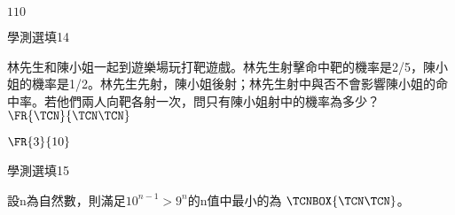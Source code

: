 \begin{QUESTIONS}
\begin{QUESTION}
\begin{QBODY}
        \end{QBODY}
        \begin{QFROMS}
        \end{QFROMS}
        \begin{QTAGS}\end{QTAGS}
        \begin{QANS}
            $110$
        \end{QANS}
        \begin{QSOLLIST}
        \end{QSOLLIST}
        \begin{QEMPTYSPACE}
        \end{QEMPTYSPACE}
    \end{QUESTION}
    \begin{QUESTION}
        \begin{ExamInfo}{84}{學測}{選填}{14}
        \end{ExamInfo}
        \begin{ExamAnsRateInfo}{}{}{}{}
        \end{ExamAnsRateInfo}
        \begin{QBODY}
            林先生和陳小姐一起到遊樂場玩打靶遊戲。林先生射擊命中靶的機率是2/5，陳小姐的機率是1/2。林先生先射，陳小姐後射；林先生射中與否不會影響陳小姐的命中率。若他們兩人向靶各射一次，問只有陳小姐射中的機率為多少？$\FR{\TCN}{\TCN\TCN}$
        \end{QBODY}
        \begin{QFROMS}
        \end{QFROMS}
        \begin{QTAGS}\end{QTAGS}
        \begin{QANS}
            $\FR{3}{10}$
        \end{QANS}
        \begin{QSOLLIST}
        \end{QSOLLIST}
        \begin{QEMPTYSPACE}
        \end{QEMPTYSPACE}
    \end{QUESTION}
    \begin{QUESTION}
        \begin{ExamInfo}{84}{學測}{選填}{15}
        \end{ExamInfo}
        \begin{ExamAnsRateInfo}{}{}{}{}
        \end{ExamAnsRateInfo}
        \begin{QBODY}
            設n為自然數，則滿足${{10}^{n-1}}>{{9}^{n}}$的n值中最小的為
            $\TCNBOX{\TCN\TCN}$。
            

\end{QBODY}
\end{QUESTION}
\end{QUESTIONS}
